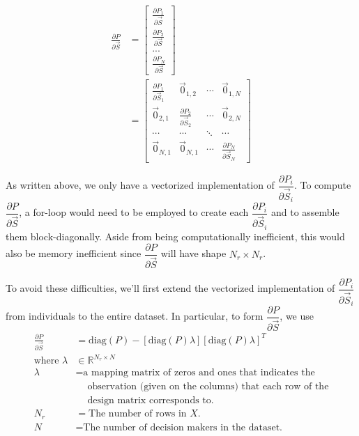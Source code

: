 \documentclass{article}
\begin{document}
\begin{equation}
\label{eqn:dp_ds}
\begin{aligned}
\frac{\partial P}{\partial \vec{S}} &= \left[ \begin{array}{c} 
\frac{\partial P_1}{\partial \vec{S}} \\[1.2ex]
\frac{\partial P_2}{\partial \vec{S}} \\
... \\
\frac{\partial P_N}{\partial \vec{S}}
\end{array} \right]
\\
&= \left[ \begin{array}{cccc} 
\frac{\partial P_1}{\partial \vec{S}_1} & \vec{0}_{1, 2}  & \cdots &  \vec{0}_{1, N}\\[1.2ex]
\vec{0}_{2, 1} & \frac{\partial P_2}{\partial \vec{S}_2}  & \cdots &  \vec{0}_{2, N}\\
\cdots & \cdots & \ddots & \cdots \\
\vec{0}_{N, 1} & \vec{0}_{N, 1} & \cdots & \frac{\partial P_N}{\partial \vec{S}_N}
\end{array} \right]
\end{aligned}
\end{equation}

As written above, we only have a vectorized implementation of $\dfrac{\partial P_i}{\partial \vec{S}_{i}}$. To compute $\dfrac{\partial P}{\partial \vec{S}}$, a for-loop would need to be employed to create each $\dfrac{\partial P_i}{\partial \vec{S}_{i}}$ and to assemble them block-diagonally. Aside from being computationally inefficient, this would also be memory inefficient since $\dfrac{\partial P}{\partial \vec{S}}$ will have shape $N_r \times N_r$.

To avoid these difficulties, we'll first extend the vectorized implementation of $\dfrac{\partial P_i}{\partial \vec{S}_{i}}$ from individuals to the entire dataset. In particular, to form $\dfrac{\partial P}{\partial \vec{S}}$, we use
\begin{equation}
\label{eq:dp-ds-vectorized}
\begin{aligned}
\frac{\partial P}{\partial \vec{S}} &= \textrm{diag} \left( P \right) - \left[ \textrm{diag} \left( P \right) \lambda \right] \left[ \textrm{diag} \left( P \right) \lambda \right]^T\\
\textrm{where } \lambda &\in \mathbb{R}^{N_r \times N} \\
\lambda &= \textrm{a mapping matrix of zeros and ones that indicates the} \\
&\quad \ \textrm{observation (given on the columns) that each row of the} \\
&\quad \ \textrm{design matrix corresponds to.} \\
N_r &= \textrm{The number of rows in $X$.}\\
N &= \textrm{The number of decision makers in the dataset.}
\end{aligned}
\end{equation}
\end{document}
